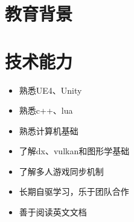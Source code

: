 \documentclass{resume}
\begin{document}



\section{教育背景}

\section{技术能力}
\begin{itemize}[parsep=0.2ex]
  \item 熟悉UE4、Unity
  \item 熟悉c++、lua
  \item 熟悉计算机基础
  \item 了解dx、vulkan和图形学基础
  \item 了解多人游戏同步机制
  \item 长期自驱学习，乐于团队合作
  \item 善于阅读英文文档
\end{itemize}

\end{document}
